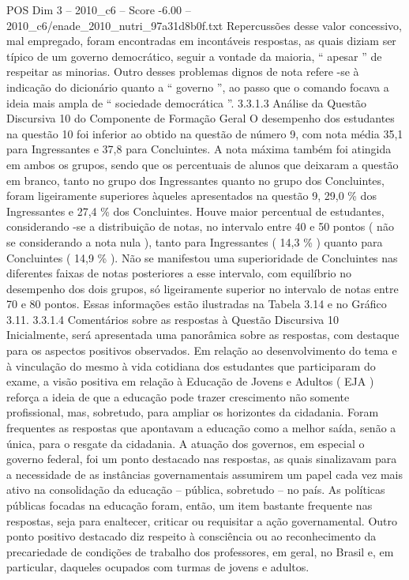 \begin{textsample}{POS Dim 3 – 2010\_c6 – Score -6.00 – 2010\_c6/enade\_2010\_nutri\_97a31d8b0f.txt}
Repercussões desse valor concessivo, mal empregado, foram encontradas em incontáveis respostas, as quais diziam ser típico de um governo democrático, seguir a vontade da maioria, “ apesar ” de respeitar as minorias.
Outro desses problemas dignos de nota refere -se à indicação do dicionário quanto a “ governo ”, ao passo que o comando focava a ideia mais ampla de “ sociedade democrática ”. 3.3.1.3 Análise da Questão Discursiva 10 do Componente de Formação Geral O desempenho dos estudantes na questão 10 foi inferior ao obtido na questão de número 9, com nota média 35,1 para Ingressantes e 37,8 para Concluintes.
A nota máxima também foi atingida em ambos os grupos, sendo que os percentuais de alunos que deixaram a questão em branco, tanto no grupo dos Ingressantes quanto no grupo dos Concluintes, foram ligeiramente superiores àqueles apresentados na questão 9, 29,0 \% dos Ingressantes e 27,4 \% dos Concluintes.
Houve maior percentual de estudantes, considerando -se a distribuição de notas, no intervalo entre 40 e 50 pontos ( não se considerando a nota nula ), tanto para Ingressantes ( 14,3 \% ) quanto para Concluintes ( 14,9 \% ).
Não se manifestou uma superioridade de Concluintes nas diferentes faixas de notas posteriores a esse intervalo, com equilíbrio no desempenho dos dois grupos, só ligeiramente superior no intervalo de notas entre 70 e 80 pontos.
Essas informações estão ilustradas na Tabela 3.14 e no Gráfico 3.11. 3.3.1.4 Comentários sobre as respostas à Questão Discursiva 10 Inicialmente, será apresentada uma panorâmica sobre as respostas, com destaque para os aspectos positivos observados.
Em relação ao desenvolvimento do tema e à vinculação do mesmo à vida cotidiana dos estudantes que participaram do exame, a visão positiva em relação à Educação de Jovens e Adultos ( EJA ) reforça a ideia de que a educação pode trazer crescimento não somente profissional, mas, sobretudo, para ampliar os horizontes da cidadania.
Foram frequentes as respostas que apontavam a educação como a melhor saída, senão a única, para o resgate da cidadania.
A atuação dos governos, em especial o governo federal, foi um ponto destacado nas respostas, as quais sinalizavam para a necessidade de as instâncias governamentais assumirem um papel cada vez mais ativo na consolidação da educação – pública, sobretudo – no país.
As políticas públicas focadas na educação foram, então, um item bastante frequente nas respostas, seja para enaltecer, criticar ou requisitar a ação governamental.
Outro ponto positivo destacado diz respeito à consciência ou ao reconhecimento da precariedade de condições de trabalho dos professores, em geral, no Brasil e, em particular, daqueles ocupados com turmas de jovens e adultos.

\end{textsample}
